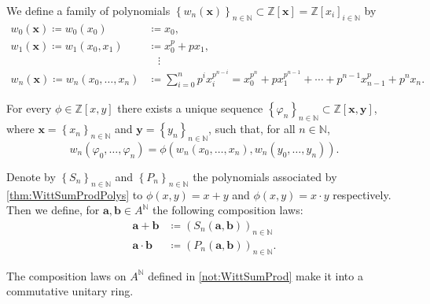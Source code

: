 \begin{defn}
	We define a family of polynomials $\left\{ w_n(\mathbf{x}) \right\}_{n \in \mathbb{N}} \subset
	\mathbb{Z}[\mathbf{x}] = \mathbb{Z}[x_i]_{i \in \mathbb{N}}$ by
	\begin{align*}
		w_0(\mathbf{x}) \coloneqq w_0(x_0) &\coloneqq x_0, \\
		w_1(\mathbf{x}) \coloneqq w_1(x_0, x_1) &\coloneqq x_0^p + px_1, \\
				&\ \ \ \ \! \vdots \\
		w_n(\mathbf{x}) \coloneqq w_n(x_0, \ldots, x_n) &\coloneqq
		\sum_{ i=0 }^{ n } p^i x_i^{p^{n-i}} =
		x_0^{p^n} + px_1^{p^{n-1}} + \cdots + p^{n-1}x_{n-1}^p + p^n x_n
	.\end{align*}
\end{defn}


\begin{lem}\label{thm:WittSumProdPolys}
	For every $\phi \in \mathbb{Z}[x,y]$ there exists a unique sequence
	$\left\{ \varphi_n \right\}_{n \in \mathbb{N}} \subset \mathbb{Z}[\mathbf{x}, \mathbf{y}]$,
	where $\mathbf{x} = \left\{ x_n \right\}_{n \in \mathbb{N}}$ and
	$\mathbf{y} = \left\{ y_n \right\}_{n \in \mathbb{N}}$, such that,
	for all $n \in \mathbb{N}$,
	\begin{equation*}
		w_n(\varphi_0, \ldots, \varphi_n) =
		\phi \left( w_n(x_0, \ldots, x_n), w_n(y_0, \ldots, y_n) \right)
	.\end{equation*}
\end{lem} 


\begin{ntt}[]\label{not:WittSumProd}
	Denote by $\left\{ S_n \right\}_{n \in \mathbb{N}}$ and
	$\left\{ P_n \right\}_{n \in \mathbb{N}}$ the polynomials associated 
	by \cref{thm:WittSumProdPolys} to 
	$\phi(x,y) = x + y$ and $\phi(x,y) = x \cdot y$ respectively.
	Then we define, for $\mathbf{a},\mathbf{b} \in A^{\mathbb{N}}$ the following
	composition laws:
	\begin{align*}
		\mathbf{a} + \mathbf{b} &\coloneqq
		\left( S_n(\mathbf{a},\mathbf{b}) \right)_{n \in \mathbb{N}}\\
		\mathbf{a} \cdot \mathbf{b} &\coloneqq 
		\left( P_n(\mathbf{a},\mathbf{b}) \right)_{n \in \mathbb{N}}
	.\end{align*}
\end{ntt}


\begin{thm}
	The composition laws on $A^{\mathbb{N}}$ defined in \cref{not:WittSumProd}
	make it into a commutative unitary ring.
\end{thm}


